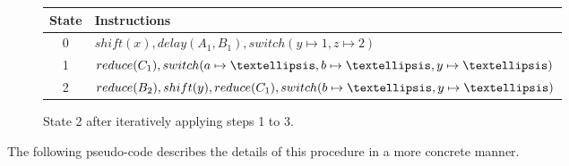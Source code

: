 \documentclass[envcountsame,runningheads]{llncs}
\begin{document}
\begin{figure}[!ht]
\vspace{1\baselineskip}
\centering
{}

\vspace{.5\baselineskip}
\small{\begin{tabular}{|c|l|}
  \hline
  \textbf{State} & \textbf{Instructions} \\
  \hline
  0 & $shift(x), delay(A_1, B_1), switch(y \mapsto 1, z \mapsto 2)$ \\
  1 & $reduce(C_1), switch(a \mapsto \textellipsis, b \mapsto \textellipsis, y \mapsto \textellipsis)$ \\ 
  2 & $reduce(B_2), shift(y), reduce(C_1), switch(b \mapsto \textellipsis, y \mapsto \textellipsis)$ \\  
  \hline
\end{tabular}}
\caption{State 2 after iteratively applying steps 1 to 3.}
\end{figure}

\clearpage
The following pseudo-code describes the details of this procedure in a more concrete manner.
\end{document}
